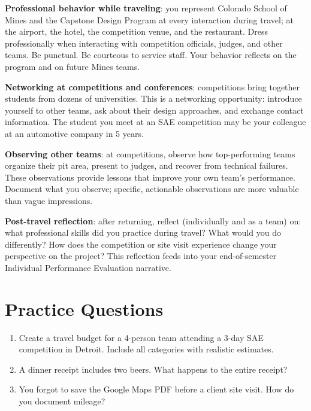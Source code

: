 \textbf{Professional behavior while traveling}: you represent Colorado School of Mines and the Capstone Design Program at every interaction during travel; at the airport, the hotel, the competition venue, and the restaurant. Dress professionally when interacting with competition officials, judges, and other teams. Be punctual. Be courteous to service staff. Your behavior reflects on the program and on future Mines teams.

\textbf{Networking at competitions and conferences}: competitions bring together students from dozens of universities. This is a networking opportunity: introduce yourself to other teams, ask about their design approaches, and exchange contact information. The student you meet at an SAE competition may be your colleague at an automotive company in 5 years.

\textbf{Observing other teams}: at competitions, observe how top-performing teams organize their pit area, present to judges, and recover from technical failures. These observations provide lessons that improve your own team's performance. Document what you observe; specific, actionable observations are more valuable than vague impressions.

\textbf{Post-travel reflection}: after returning, reflect (individually and as a team) on: what professional skills did you practice during travel? What would you do differently? How does the competition or site visit experience change your perspective on the project? This reflection feeds into your end-of-semester Individual Performance Evaluation narrative.


\section{Practice Questions}
\begin{enumerate}[leftmargin=1.5em]
\item Create a travel budget for a 4-person team attending a 3-day SAE competition in Detroit. Include all categories with realistic estimates.
\item A dinner receipt includes two beers. What happens to the entire receipt?
\item You forgot to save the Google Maps PDF before a client site visit. How do you document mileage?
\end{enumerate}


